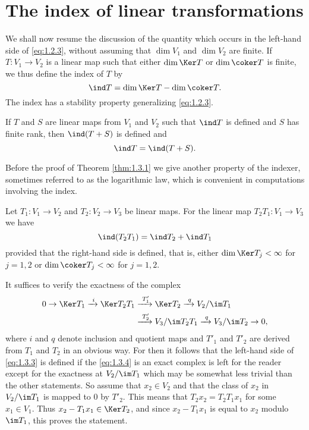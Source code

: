 \section{The index of linear transformations}
We shall now resume the discussion of the quantity which occurs in the
left-hand side of \eqref{eq:1.2.3}, without assuming that $\dim V_1$
and $\dim V_2$ are finite. If $T:V_1\to V_2$ is a linear map such that
either $\dim\Ker T$ or $\dim\coker T$ is finite, we thus
define the index of $T$ by
\begin{equation}
  \label{eq:1.3.1}
  \ind T=\dim\Ker T-\dim\coker T.
\end{equation}
The index has a stability property generalizing \eqref{eq:1.2.3}.
\begin{thm}
  \label{thm:1.3.1}
  If $T$ and $S$ are linear maps from $V_1$ and $V_2$ such that
  $\ind T$ is defined and $S$ has finite rank, then
  $\ind (T+S)$ is defined and
  \begin{equation}
    \label{eq:1.3.2}
    \ind T=\ind (T+S).
  \end{equation}
\end{thm}
Before the proof of Theorem \ref{thm:1.3.1} we give another property
of the indexer, sometimes referred to as the logarithmic law, which is
convenient in computations involving the index.
\begin{thm}
  \label{thm:1.3.2}
  Let $T_1:V_1\to V_2$ and $T_2:V_2\to V_3$ be linear maps. For the
  linear map $T_2T_1:V_1\to V_3$ we have
  \begin{equation}
    \label{eq:1.3.3}
    \ind (T_2T_1)=\ind T_2+\ind T_1
  \end{equation}
provided that the right-hand side is defined, that is, either
$\dim\Ker T_j<\infty$ for $j=1,2$ or $\dim\coker T_j<\infty$
for $j=1,2$.
\end{thm}
\begin{prf}
  It suffices to verify the exactness of the complex
  \begin{equation}
    \label{eq:1.3.4}
    \begin{aligned}
      0\to\Ker T_1\xrightarrow{\ i}\Ker T_2T_1&\xrightarrow{\ T'_1}\Ker
      T_2\xrightarrow{\ q}V_2/\im T_1
      \\
      &\xrightarrow{\ T'_2}V_3/\im T_2T_1\xrightarrow{\ q}V_3/\im T_2\to0,
    \end{aligned}
  \end{equation}
where $i$ and $q$ denote inclusion and quotient maps and $T'_1$ and
$T'_2$ are derived from $T_1$ and $T_2$ in an obvious way. For then it
follows that the left-hand side of \eqref{eq:1.3.3} is defined if the
\eqref{eq:1.3.4} is an exact complex is left for the reader except for
the exactness at $V_2/\im T_1$ which may be somewhat less trivial than
the other statements. So assume that $x_2\in V_2$ and that the class
of $x_2$ in $V_2/\im T_1$ is mapped to $0$ by $T'_2$. This means that
$T_2x_2=T_2T_1x_1$ for some $x_1\in V_1$. Thus $x_2-T_1x_1\in\Ker
T_2$, and since $x_2-T_1x_1$ is equal to $x_2$ modulo $\im T_1$, this
proves the statement. 
\end{prf}
